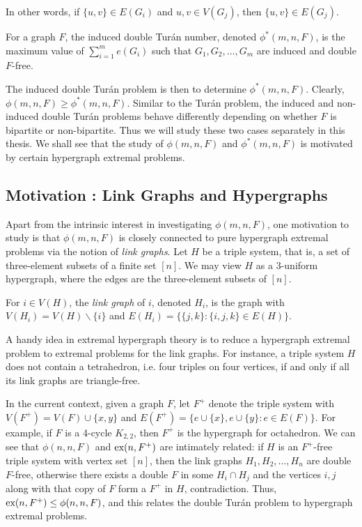 In other words, if $\{u, v\} \in E(G_i)$ and $u, v \in V(G_j)$, then $\{u,v\} \in E(G_j)$.

\begin{definition}
  For a graph $F$, the induced double Turán number, denoted $\phi^*(m, n, F)$, is the maximum value of $\sum_{i = 1}^m e(G_i)$ such that $G_1, G_2, \dots, G_m$ are induced and double $F$-free.
\end{definition}

The induced double Tur\'{a}n problem is then to determine $\phi^*(m, n, F)$. Clearly, $\phi(m, n, F) \geq \phi^*(m, n, F)$. Similar to the Turán problem, the induced and non-induced double Turán problems behave differently depending on whether $F$ is bipartite or non-bipartite. Thus we will study these two cases separately in this thesis. We shall see that the study of $\phi(m, n, F)$ and $\phi^*(m, n, F)$ is motivated by certain hypergraph extremal problems.

\subsection{Motivation : Link Graphs and Hypergraphs}

Apart from the intrinsic interest in investigating $\phi(m, n, F)$, one motivation to study is that $\phi(m, n, F)$ is closely connected to pure hypergraph extremal problems via the notion of \textit{link graphs}. Let $H$ be a triple system, that is, a set of three-element subsets of a finite set $[n]$. We may view $H$ as a 3-uniform hypergraph, where the edges are the three-element subsets of $[n]$. 

\begin{definition}
  For $i \in V(H)$, the \textit{link graph} of $i$, denoted $H_i$, is the graph with $V(H_i) = V(H) \backslash \{i\}$ and $E(H_i) = \{\{j, k\} : \{i, j, k\} \in E(H)\}$.
\end{definition}

A handy idea in extremal hypergraph theory is to reduce a hypergraph extremal problem to extremal problems for the link graphs. For instance, a triple system $H$ does not contain a tetrahedron, i.e. four triples on four vertices, if and only if all its link graphs are triangle-free.

In the current context, given a graph $F$, let $F^+$ denote the triple system with $V(F^+) = V(F) \cup \{x, y\}$ and $E(F^+) = \{e \cup \{x\}, e \cup \{y\} : e \in E(F)\}$. For example, if $F$ is a 4-cycle $K_{2,2}$, then $F^+$ is the hypergraph for octahedron. We can see that $\phi(n, n, F)$ and $\textnormal{ex}(n, F^+)$ are intimately related: if $H$ is an $F^+$-free triple system with vertex set $[n]$, then the link graphs $H_1, H_2, \dots, H_n$ are double $F$-free, otherwise there exists a double $F$ in some $H_i \cap H_j$ and the vertices $i, j$ along with that copy of $F$ form a $F^+$ in $H$, contradiction. Thus, $\textnormal{ex}(n, F^+) \leq \phi(n, n, F)$, and this relates the double Tur\'{a}n problem to hypergraph extremal problems.

